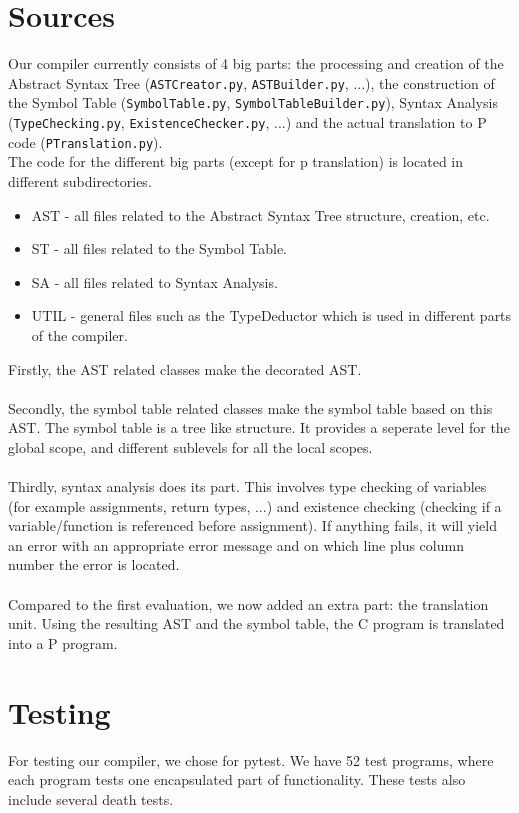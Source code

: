 \documentclass{article}
\begin{document}
\section{Sources}
Our compiler currently consists of 4 big parts: the processing and creation of the Abstract Syntax Tree (\texttt{ASTCreator.py}, \texttt{ASTBuilder.py}, ...), the construction of the Symbol Table (\texttt{SymbolTable.py}, \texttt{SymbolTableBuilder.py}), Syntax Analysis (\texttt{TypeChecking.py}, \texttt{ExistenceChecker.py}, ...) and the actual translation to P code (\texttt{PTranslation.py}).
\\
The code for the different big parts (except for p translation) is located in different subdirectories. \\
\begin{itemize}
	\item AST - all files related to the Abstract Syntax Tree structure, creation, etc.
	\item ST - all files related to the Symbol Table.
	\item SA - all files related to Syntax Analysis.
	\item UTIL - general files such as the TypeDeductor which is used in different parts of the compiler.
\end{itemize}

\newpage
\hfill \break
Firstly, the AST related classes make the decorated AST. \\ \\
Secondly, the symbol table related classes make the symbol table based on this AST. The symbol table is a tree like structure. It provides a seperate level for the global scope, and different sublevels for all the local scopes. \\ \\
Thirdly, syntax analysis does its part. This involves type checking of variables (for example assignments, return types, ...) and existence checking (checking if a variable/function is referenced before assignment). If anything fails, it will yield an error with an appropriate error message and on which line plus column number the error is located. \\ \\
\hfill \break
Compared to the first evaluation, we now added an extra part: the translation unit. Using the resulting AST and the symbol table, the C program is translated into a P program.

\section{Testing}
For testing our compiler, we chose for pytest. We have 52 test programs, where each program tests one encapsulated part of functionality. These tests also include several death tests.
\end{document}
